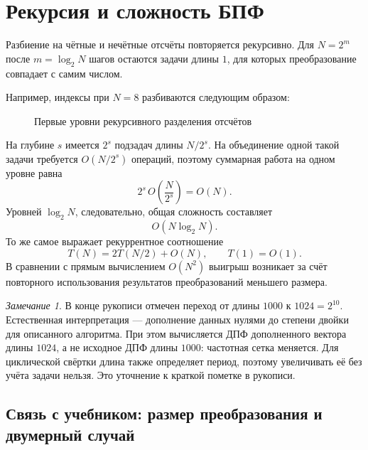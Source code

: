 \documentclass[12pt,a4paper]{article}
\theoremstyle{definition}
\theoremstyle{remark}
\newtheorem*{remark}{Замечание}
\begin{document}
\section{Рекурсия и сложность БПФ}

Разбиение на чётные и нечётные отсчёты повторяется рекурсивно. Для
$N=2^m$ после $m=\log_2N$ шагов остаются задачи длины $1$, для которых
преобразование совпадает с самим числом.

Например, индексы при $N=8$ разбиваются следующим образом:
\begin{figure}[ht]
  \centering
  \caption{Первые уровни рекурсивного разделения отсчётов}
\end{figure}

На глубине $s$ имеется $2^s$ подзадач длины $N/2^s$. На объединение
одной такой задачи требуется $O(N/2^s)$ операций, поэтому суммарная
работа на одном уровне равна
\[
  2^s\,O\left(\frac{N}{2^s}\right)=O(N).
\]
Уровней $\log_2N$, следовательно, общая сложность составляет
\[
  \boxed{O(N\log_2N)}.
\]
То же самое выражает рекуррентное соотношение
\[
  T(N)=2T(N/2)+O(N),\qquad T(1)=O(1).
\]
В сравнении с прямым вычислением $O(N^2)$ выигрыш возникает за счёт
повторного использования результатов преобразований меньшего размера.

\begin{remark}
В конце рукописи отмечен переход от длины $1000$ к $1024=2^{10}$.
Естественная интерпретация --- дополнение данных нулями до степени
двойки для описанного алгоритма. При этом вычисляется ДПФ дополненного
вектора длины $1024$, а не исходное ДПФ длины $1000$: частотная сетка
меняется. Для циклической свёртки длина также определяет период, поэтому
увеличивать её без учёта задачи нельзя. Это уточнение к краткой пометке
в рукописи.
\end{remark}

\subsection{Связь с учебником: размер преобразования и двумерный случай}
\end{document}
